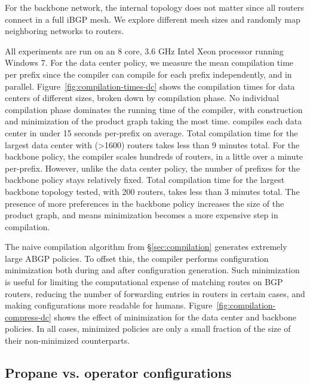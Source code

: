 For the backbone network, the internal topology does not matter since all routers connect in a full iBGP mesh. We explore different mesh sizes and randomly map neighboring networks to routers.

All experiments are run on an 8 core, 3.6 GHz Intel Xeon processor running Windows 7.
%
For the data center policy, we measure the mean compilation time per prefix since the \sysname compiler can compile for each prefix independently, and in parallel. Figure~\ref{fig:compilation-times-dc} shows the compilation times for data centers of different sizes, broken down by compilation phase. No individual compilation phase dominates the running time of the compiler, with construction and minimization of the product graph taking the most time. \sysname compiles each data center in under 15 seconds per-prefix on average. Total compilation time for the largest data center with (>1600) routers takes less than 9 minutes total.
%
For the backbone policy, the \sysname compiler scales hundreds of routers, in a little over a minute per-prefix. However, unlike the data center policy, the number of prefixes for the backbone policy stays relatively fixed. Total compilation time for the largest backbone topology tested, with 200 routers, takes less than 3 minutes total. The presence of more preferences in the backbone policy increases the size of the product graph, and means minimization becomes a more expensive step in compilation. 

The naive compilation algorithm from \S\ref{sec:compilation} generates extremely large ABGP policies. To offset this, the compiler performs configuration minimization both during and after configuration generation. Such minimization is useful for limiting the computational expense of matching routes on BGP routers, reducing the number of forwarding entries in routers in certain cases, and making configurations more readable for humans. Figure~\ref{fig:compilation-compress-dc} shows the effect of minimization for the data center and backbone policies. In all cases, minimized policies are only a small fraction of the size of their non-minimized counterparts.


\subsection{Propane vs. operator configurations}

